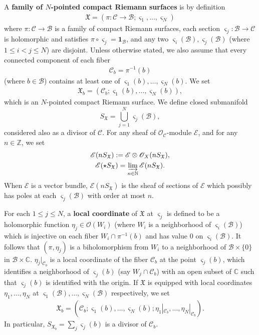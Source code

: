 \documentclass[12pt,a4paper,notitlepage]{article}
\theoremstyle{definition}
\theoremstyle{plain}
\newcommand{\fk}{\mathfrak}
\newcommand{\mc}{\mathcal}
\newcommand{\id}{\mathbf{1}}
\newcommand{\scr}{\mathscr}
\newcommand{\sgm}{\varsigma}
\newcommand{\SX}{{S_{\fk X}}}
\newcommand{\Cbb}{\mathbb C}
\newcommand{\Nbb}{\mathbb N}
\newcommand{\Zbb}{\mathbb Z}
\numberwithin{equation}{section}
\begin{document}


A \textbf{family of $N$-pointed compact Riemann surfaces} is by definition
\begin{align}
	\fk X=(\pi:\mc C\rightarrow\mc B;\sgm_1,\dots,\sgm_N)\label{eq2}	
\end{align}
where $\pi:\mc C\rightarrow\mc B$ is a family of compact Riemann surfaces, each section $\sgm_j:\mc B\rightarrow\mc C$ is holomorphic and satisfies $\pi\circ\sgm_j=\id_{\mc B}$, and any two $\sgm_i(\mc B),\sgm_j(\mc B)$ (where $1\leq i<j\leq N$) are disjoint. Unless otherwise stated, we also assume that every connected component of each fiber \index{CbXb@$\mc C_b,\fk X_b$}
\begin{align*}
	\mc C_b=\pi^{-1}(b)	
\end{align*}
(where $b\in\mc B$) contains at least one of $\sgm_1(b),\dots,\sgm_N(b)$. We set
\begin{align*}
	\fk X_b=(\mc C_b;\sgm_1(b),\dots,\sgm_N(b)),	
\end{align*}
which is an $N$-pointed compact Riemann surface. We define closed submanifold \index{SX@$\SX$}
\begin{equation*}
	\SX=\bigcup_{j=1}^N\sgm_j(\mc B),	
\end{equation*}
considered also as a divisor of $\mc C$. For any sheaf of $\scr O_{\mc C}$-module $\scr E$, and for any $n\in\Zbb$, we set \index{ES@$\scr E(n\SX),\scr E(\star\SX)$}
\begin{gather*}
	\scr E(n\SX):=\scr E\otimes\scr O_X(n\SX),\\
	\scr E(\star\SX)=\varinjlim_{n\in\Nbb}\scr E(n\SX).
\end{gather*}
When $\scr E$ is a vector bundle, $\scr E(n\SX)$ is the sheaf of sections of $\scr E$ which possibly has poles at each $\sgm_j(\mc B)$ with order at most $n$. 




For each $1\leq j\leq N$, a \textbf{local coordinate} of $\fk X$ at $\sgm_j$ is defined to be a holomorphic function $\eta_j\in\scr O(W_i)$ (where $W_i$ is a neighborhood of $\sgm_i(\mc B)$) which is injective on each fiber $W_i\cap\pi^{-1}(b)$ and has value $0$ on $\sgm_i(\mc B)$. It follows that $(\pi,\eta_j)$ is a biholomorphism from $W_i$ to a neighborhood of $\mc B\times\{0\}$ in $\mc B\times\Cbb$. $\eta_j|_{\mc C_b}$ is a local coordinate of the fiber $\mc C_b$ at the point $\sgm_j(b)$, which identifies a neighborhood  of $\sgm_j(b)$ (say $W_j\cap\mc C_b$) with an open subset of $\Cbb$ such that $\sgm_j(b)$ is identified with the origin. If $\fk X$ is equipped with local coordinates $\eta_1,\dots,\eta_N$ at $\sgm_1(\mc B),\dots,\sgm_N(\mc B)$ respectively, we set
\begin{align*}
\fk X_b=(\mc C_b;\sgm_1(b),\dots,\sgm_N(b);\eta_1|_{\mc C_b},\dots,\eta_N|_{\mc C_b}).	
\end{align*}
In particular, $S_{\fk X_b}=\sum_j\sgm_j(b)$ is a divisor of $\mc C_b$.
\end{document}
